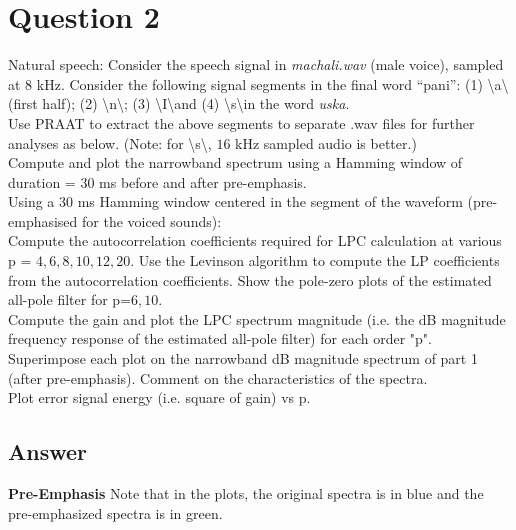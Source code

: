 \documentclass[a4paper]{article}
\begin{document}
\newpage


\section{Question 2}
Natural speech: Consider the speech signal in \textit{machali.wav} (male voice), sampled at $8$ kHz.  Consider the following signal segments in the final word “pani”:  (1)  \textbackslash a\textbackslash   (first half);  (2) \textbackslash n\textbackslash ;  (3) \textbackslash I\textbackslash  and (4) \textbackslash s\textbackslash in the word \textit{uska}.  \\ 

Use PRAAT to extract the above segments to separate .wav files for further analyses as below.  (Note: for \textbackslash s\textbackslash, $16$ kHz sampled audio is better.) \\ 

Compute and plot the narrowband spectrum using a Hamming window of duration = $30$ ms before and after pre-emphasis. \\ 

Using a 30 ms Hamming window centered in the segment of the waveform (pre-emphasised for the voiced sounds): \\ 

Compute the autocorrelation coefficients required for LPC calculation at various p = $4,6,8,10,12,20$.  Use the Levinson algorithm to compute the LP coefficients from the autocorrelation coefficients. Show the pole-zero plots of the estimated all-pole filter for p=$6,10$.  \\ 

Compute the gain and plot the LPC spectrum magnitude (i.e. the dB magnitude frequency response of the estimated all-pole filter) for each order "p". Superimpose each plot on the narrowband dB magnitude spectrum of part 1 (after pre-emphasis). Comment on the characteristics of the spectra. \\ 
 
Plot error signal energy (i.e. square of gain) vs p. \\ 

\subsection{Answer}

\textbf{Pre-Emphasis}
Note that in the plots, the original spectra is in blue and the pre-emphasized spectra is in green. 
\end{document}
